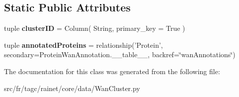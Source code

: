 \subsection*{Static Public Attributes}
\begin{DoxyCompactItemize}
\item 
\hypertarget{classsrc_1_1fr_1_1tagc_1_1rainet_1_1core_1_1data_1_1WanCluster_1_1WanCluster_a9dd266bd6a1fc3083ff9d28ac89381dd}{tuple {\bfseries cluster\-I\-D} = Column( String, primary\-\_\-key = True )}\label{classsrc_1_1fr_1_1tagc_1_1rainet_1_1core_1_1data_1_1WanCluster_1_1WanCluster_a9dd266bd6a1fc3083ff9d28ac89381dd}

\item 
\hypertarget{classsrc_1_1fr_1_1tagc_1_1rainet_1_1core_1_1data_1_1WanCluster_1_1WanCluster_a2c6da17c011b958319be365c87043ee1}{tuple {\bfseries annotated\-Proteins} = relationship('Protein', secondary=Protein\-Wan\-Annotation.\-\_\-\-\_\-table\-\_\-\-\_\-, backref=\char`\"{}wan\-Annotations\char`\"{})}\label{classsrc_1_1fr_1_1tagc_1_1rainet_1_1core_1_1data_1_1WanCluster_1_1WanCluster_a2c6da17c011b958319be365c87043ee1}

\end{DoxyCompactItemize}


The documentation for this class was generated from the following file\-:\begin{DoxyCompactItemize}
\item 
src/fr/tagc/rainet/core/data/Wan\-Cluster.\-py\end{DoxyCompactItemize}

